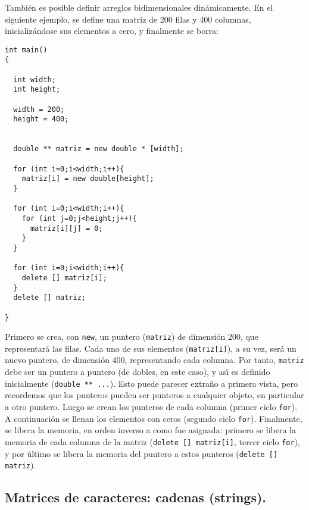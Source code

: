 Tambi\'en es posible definir arreglos bidimensionales
din\'amicamente. En el siguiente ejemplo, se define una matriz de 200
filas y 400 columnas, inicializ\'andose sus elementos a cero, y
finalmente se borra:
\begin{verbatim}
int main()
{
  
  int width;
  int height;

  width = 200;
  height = 400;
  

  double ** matriz = new double * [width];
 
  for (int i=0;i<width;i++){
    matriz[i] = new double[height];
  }

  for (int i=0;i<width;i++){
    for (int j=0;j<height;j++){
      matriz[i][j] = 0;
    }
  }
 
  for (int i=0;i<width;i++){
    delete [] matriz[i];
  }
  delete [] matriz;
  
}
\end{verbatim}

Primero se crea, con \verb+new+, un puntero (\verb+matriz+) 
de dimensi\'on 200, que
representar\'a las filas. Cada
uno de sus elementos (\verb+matriz[i]+), a su vez, ser\'a un nuevo puntero, de
dimensi\'on 400, representando cada columna. Por tanto, \verb+matriz+
debe ser un puntero a puntero (de dobles, en este caso), y as\'{\i} es
definido inicialmente (\verb+double ** ...+).  Esto puede parecer
extra\~no a primera vista, pero recordemos que los punteros pueden ser
punteros a cualquier objeto, en particular a otro puntero. 
Luego se crean los
punteros de cada columna (primer ciclo \verb+for+). A continuaci\'on
se llenan los elementos con ceros (segundo ciclo
\verb+for+). Finalmente, se libera la memoria, en orden inverso a como
fue asignada: primero se libera la memoria de cada columna de la
matriz (\verb+delete [] matriz[i]+, tercer ciclo \verb+for+), y por
\'ultimo se libera la memoria del puntero a estos punteros
(\verb+delete [] matriz+). 


\subsection{Matrices de caracteres: cadenas (strings).}

